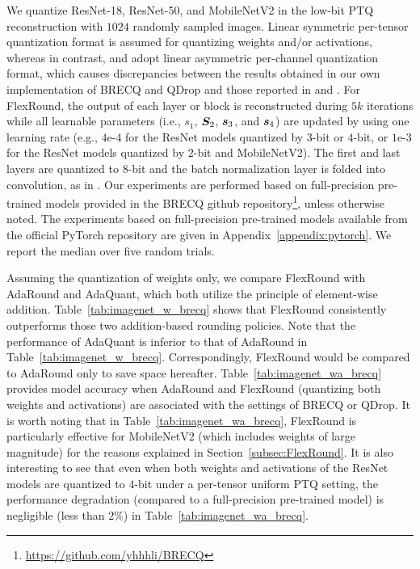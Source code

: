 \documentclass{article}
\theoremstyle{plain}
\theoremstyle{definition}
\theoremstyle{remark}
\begin{document}
We quantize ResNet-18, ResNet-50, and MobileNetV2 in the low-bit PTQ reconstruction with $1024$ randomly sampled images. Linear symmetric per-tensor quantization format is assumed for quantizing weights and/or activations, whereas in contrast, \citet{li2021brecq} and \citet{wei2022qdrop} adopt linear asymmetric per-channel quantization format, which causes discrepancies between the results obtained in our own implementation of BRECQ and QDrop and those reported in \citet{li2021brecq} and \citet{wei2022qdrop}. For FlexRound, the output of each layer or block is reconstructed during $5k$ iterations while all learnable parameters (i.e., $s_1$, ${\bm{S}}_2$, ${\bm{s}}_3$, and ${\bm{s}}_4$) are updated by using one learning rate (e.g., $4$e-$4$ for the ResNet models quantized by $3$-bit or $4$-bit, or $1$e-$3$ for the ResNet models quantized by $2$-bit and MobileNetV2). The first and last layers are quantized to $8$-bit and the batch normalization layer is folded into convolution, as in \citet{li2021brecq}. Our experiments are performed based on full-precision pre-trained models provided in the BRECQ github repository\footnote{\url{https://github.com/yhhhli/BRECQ}}, unless otherwise noted.
The experiments based on full-precision pre-trained models available from the official PyTorch repository are given in Appendix~\ref{appendix:pytorch}. We report the median over five random trials. 

Assuming the quantization of weights only, we compare FlexRound with AdaRound and AdaQuant, which both utilize the principle of element-wise addition. Table~\ref{tab:imagenet_w_brecq} shows that FlexRound consistently outperforms those two addition-based rounding policies. Note that the performance of AdaQuant is inferior to that of AdaRound in Table~\ref{tab:imagenet_w_brecq}. Correspondingly, FlexRound would be compared to AdaRound only to save space hereafter. Table~\ref{tab:imagenet_wa_brecq} provides model accuracy when AdaRound and FlexRound (quantizing both weights and activations) are associated with the settings of BRECQ or QDrop.
It is worth noting that in Table~\ref{tab:imagenet_wa_brecq}, FlexRound is particularly effective for MobileNetV2 (which includes weights of large magnitude) for the reasons explained in Section~\ref{subsec:FlexRound}.
It is also interesting to see that even when both weights and activations of the ResNet models are quantized to $4$-bit under a per-tensor uniform PTQ setting, the performance degradation (compared to a full-precision pre-trained model) is negligible (less than $2\%$) in Table~\ref{tab:imagenet_wa_brecq}.
\end{document}
